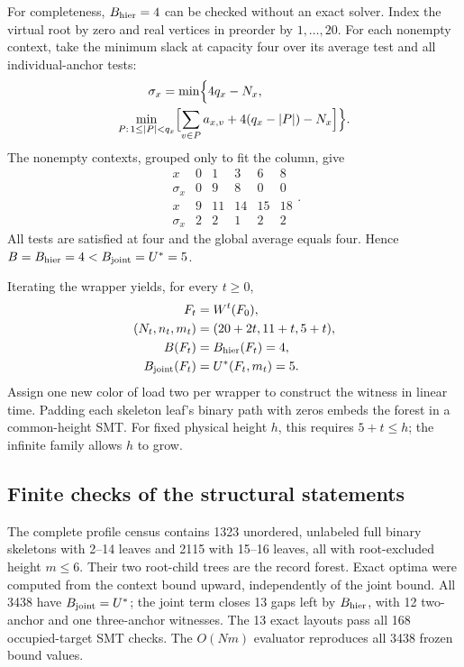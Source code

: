 For completeness, $B_{\rm hier}=4$ can be checked without an exact
solver. Index the virtual root by zero and real vertices in preorder
by $1,\ldots,20$. For each nonempty context, take the minimum slack
at capacity four over its average test and all individual-anchor tests:
\begin{equation}
 \begin{split}
 \sigma_x=\min\Bigl\{4q_x-N_x,\qquad\qquad\qquad\quad\\
 \min_{P:\,1\le|P|<q_x}
 \Bigl[\sum_{v\in P}a_{x,v}+4(q_x-|P|)-N_x\Bigr]\Bigr\}.
 \end{split}
 \label{eq:supp-seed-slack}
\end{equation}
The nonempty contexts, grouped only to fit the column, give
\begin{equation}
 \begin{array}{c|rrrrr}
 x&0&1&3&6&8\\ \hline
 \sigma_x&0&9&8&0&0\\[2pt]
 x&9&11&14&15&18\\ \hline
 \sigma_x&2&2&1&2&2
 \end{array}.
 \label{eq:supp-seed-slack-values}
\end{equation}
All tests are satisfied at four and the global average equals four.
Hence $B=B_{\rm hier}=4<B_{\rm joint}=U^*=5$.

Iterating the wrapper yields, for every $t\ge0$,
\begin{align}
 F_t&=W^t(F_0),\\
 (N_t,n_t,m_t)&=(20+2t,11+t,5+t),\label{eq:supp-wrapper-family}\\
 B(F_t)&=B_{\rm hier}(F_t)=4,\\
 B_{\rm joint}(F_t)&=U^*(F_t,m_t)=5.
 \label{eq:supp-wrapper-family-gap}
\end{align}
Assign one new color of load two per wrapper to construct the witness
in linear time. Padding each skeleton leaf's binary path with zeros
embeds the forest in a common-height SMT. For fixed physical height
$h$, this requires $5+t\le h$; the infinite family allows $h$ to grow.

\subsection{Finite checks of the structural statements}
The complete profile census contains 1323 unordered, unlabeled full
binary skeletons with 2--14 leaves and 2115 with 15--16 leaves, all
with root-excluded height $m\le6$. Their two root-child trees are the
record forest. Exact optima were computed from the context bound
upward, independently of the joint bound. All 3438 have
$B_{\rm joint}=U^*$; the joint term closes 13 gaps left by
$B_{\rm hier}$, with 12 two-anchor and one three-anchor witnesses.
The 13 exact layouts pass all 168 occupied-target SMT checks.
The $O(Nm)$ evaluator reproduces all 3438 frozen bound values.


